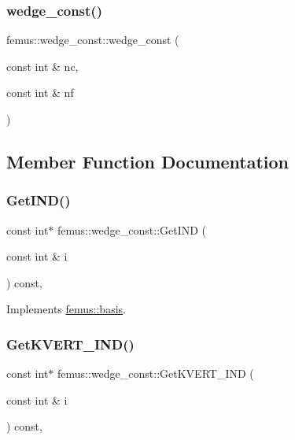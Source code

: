 \subsubsection{\texorpdfstring{wedge\+\_\+const()}{wedge\_const()}}
{\footnotesize\ttfamily femus\+::wedge\+\_\+const\+::wedge\+\_\+const (\begin{DoxyParamCaption}\item[{const int \&}]{nc,  }\item[{const int \&}]{nf }\end{DoxyParamCaption})\hspace{0.3cm}{\ttfamily [inline]}}



\subsection{Member Function Documentation}
\mbox{\label{classfemus_1_1wedge__const_a46e874c0a6d178ba0fbfa4169419c2f7}} 
\subsubsection{\texorpdfstring{Get\+I\+N\+D()}{GetIND()}}
{\footnotesize\ttfamily const int$\ast$ femus\+::wedge\+\_\+const\+::\+Get\+I\+ND (\begin{DoxyParamCaption}\item[{const int \&}]{i }\end{DoxyParamCaption}) const\hspace{0.3cm}{\ttfamily [inline]}, {\ttfamily [virtual]}}



Implements \mbox{\hyperlink{classfemus_1_1basis_a3f63ad97ce70cd4a1196ede69f1f144b}{femus\+::basis}}.

\mbox{\label{classfemus_1_1wedge__const_a5b8d6664b44889cea478a6c5c68126d1}} 
\subsubsection{\texorpdfstring{Get\+K\+V\+E\+R\+T\+\_\+\+I\+N\+D()}{GetKVERT\_IND()}}
{\footnotesize\ttfamily const int$\ast$ femus\+::wedge\+\_\+const\+::\+Get\+K\+V\+E\+R\+T\+\_\+\+I\+ND (\begin{DoxyParamCaption}\item[{const int \&}]{i }\end{DoxyParamCaption}) const\hspace{0.3cm}{\ttfamily [inline]}, {\ttfamily [virtual]}}



